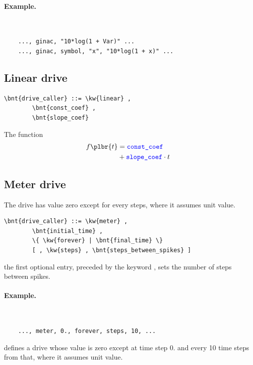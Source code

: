 \paragraph{Example.} \
\begin{verbatim}
    ..., ginac, "10*log(1 + Var)" ...
    ..., ginac, symbol, "x", "10*log(1 + x)" ...
\end{verbatim}

\subsection{Linear drive}\label{sec:DriveCaller:LINEAR}
\begin{Verbatim}[commandchars=\\\{\}]
    \bnt{drive_caller} ::= \kw{linear} ,
        \bnt{const_coef} ,
        \bnt{slope_coef}
\end{Verbatim}
The function
\begin{align}
	f\plbr{t} &= \nt{const\_coef} \nonumber \\
		&+ \nt{slope\_coef} \cdot t
\end{align}

\subsection{Meter drive}
The  drive has value zero except for every  steps,
where it assumes unit value.
\begin{Verbatim}[commandchars=\\\{\}]
    \bnt{drive_caller} ::= \kw{meter} ,
        \bnt{initial_time} ,
        \{ \kw{forever} | \bnt{final_time} \}
        [ , \kw{steps} , \bnt{steps_between_spikes} ]
\end{Verbatim}
the first optional entry, preceded by the keyword , sets the
number of steps between spikes.

\paragraph{Example.} \
\begin{verbatim}
    ..., meter, 0., forever, steps, 10, ...
\end{verbatim}
defines a drive whose value is zero except at time step 0. 
and every 10 time steps from that, where it assumes unit value.

